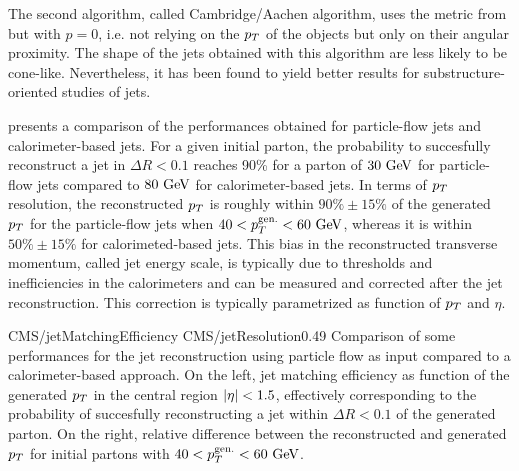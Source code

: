         The second algorithm, called Cambridge/Aachen algorithm, uses the metric from
         but with $p = 0$, i.e. not relying on the $p_T$ of
        the objects but only on their angular proximity. The shape of the jets obtained with
        this algorithm are less likely to be cone-like. Nevertheless, it has been found to
        yield better results for substructure-oriented studies of jets.

         presents a comparison of the performances obtained
        for particle-flow jets and calorimeter-based jets. For a given initial parton, the
        probability to succesfully reconstruct a jet in $\Delta R < 0.1$ reaches 90\% for
        a parton of $30~\text{GeV}$ for particle-flow jets compared to $80~\text{GeV}$ for
        calorimeter-based jets. In terms of $p_T$ resolution, the reconstructed $p_T$ is
        roughly within $90\% \pm 15\%$ of the generated $p_T$ for the particle-flow jets
        when $40 < p_T^\text{gen.} < 60~\text{GeV}$, whereas it is within $50\% \pm 15\%$ for
        calorimeted-based jets. This bias in the reconstructed transverse momentum, called
        jet energy scale, is typically due to thresholds and inefficiencies in the calorimeters
        and can be measured and corrected after the jet reconstruction. This correction is
        typically parametrized as function of $p_T$ and $\eta$.


        {CMS/jetMatchingEfficiency}
        {CMS/jetResolution}{0.49}
        {Comparison of some performances for the jet reconstruction using particle flow as
        input compared to a calorimeter-based approach. On the left, jet matching efficiency
        as function of the generated $p_T$ in the central region $\left| \eta \right| < 1.5$, effectively
        corresponding to the probability of succesfully reconstructing a jet within
        $\Delta R < 0.1$ of the generated parton. On the right, relative difference between
        the reconstructed and generated $p_T$ for initial partons with $40 < p_T^\text{gen.} < 60~\text{GeV}$.}


